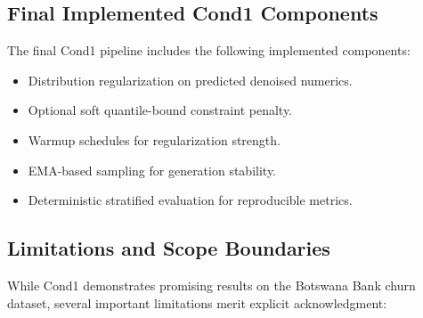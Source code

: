 \documentclass[10pt,conference,a4paper]{IEEEtran}
\begin{document}
\subsection{Final Implemented Cond1 Components}
The final Cond1 pipeline includes the following implemented components:
\begin{itemize}
    \item Distribution regularization on predicted denoised numerics.
    \item Optional soft quantile-bound constraint penalty.
    \item Warmup schedules for regularization strength.
    \item EMA-based sampling for generation stability.
    \item Deterministic stratified evaluation for reproducible metrics.
\end{itemize}

\subsection{Limitations and Scope Boundaries}
While Cond1 demonstrates promising results on the Botswana Bank churn dataset, several important limitations merit explicit acknowledgment:
\end{document}
